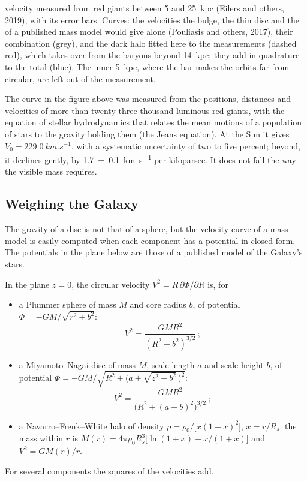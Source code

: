 \begin{omfigure}
{velocity measured from red giants between 5 and \qty{25}{kpc} (Eilers
and others, 2019), with its error bars. Curves: the velocities the
bulge, the thin disc and the  of a published mass model would
give alone (Pouliasis and others, 2017), their combination (grey), and
the dark halo fitted here to the measurements (dashed red), which takes
over from the baryons beyond \qty{14}{kpc}; they add in quadrature to
the total (blue). The inner \qty{5}{kpc}, where the bar makes the orbits
far from circular, are left out of the measurement.}\label{fig:b3:milky-way-galaxies:rotation}
\end{omfigure}

The curve in the figure above was measured from the positions, distances
and velocities of more than twenty-three thousand luminous red giants,
with the equation of stellar hydrodynamics that relates the mean motions
of a population of stars to the gravity holding them (the Jeans equation).
At the Sun it gives $V_0 = \qty{229.0}{km.s^{-1}}$, with a systematic
uncertainty of two to five percent; beyond, it declines gently, by
\qty[separate-uncertainty=true]{1.7 \pm 0.1}{km.s^{-1}} per kiloparsec. It
does not fall the way the visible mass requires.

\subsection*{Weighing the Galaxy}

The gravity of a disc is not that of a sphere, but the velocity curve of
a mass model is easily computed when each component has a potential in
closed form. The potentials in the plane below are those of a published
model of the Galaxy's stars.

\begin{proposition}\label{prop:b3:milky-way-galaxies:models}
In the plane $z = 0$, the circular velocity $V^2 = R\,\partial\Phi/\partial R$
is, for
\begin{itemize}
\item a Plummer sphere of mass $M$ and core radius $b$, of potential
  $\Phi = -GM/\sqrt{r^2 + b^2}$:
  \[ V^2 = \frac{GMR^2}{(R^2 + b^2)^{3/2}}\,; \]
\item a Miyamoto--Nagai disc of mass $M$, scale length $a$ and scale
  height $b$, of potential
  $\Phi = -GM\big/\sqrt{R^2 + \bigl(a + \sqrt{z^2 + b^2}\,\bigr)^2}$:
  \[ V^2 = \frac{GMR^2}{\bigl(R^2 + (a + b)^2\bigr)^{3/2}}\,; \]
\item a Navarro--Frenk--White halo of density
  $\rho = \rho_0\big/\bigl[x(1 + x)^2\bigr]$, $x = r/R_s$: the mass within $r$
  is $M(r) = 4\pi\rho_0R_s^3\bigl[\ln(1 + x) - x/(1 + x)\bigr]$ and
  $V^2 = GM(r)/r$.
\end{itemize}
For several components the squares of the velocities add.
\end{proposition}

